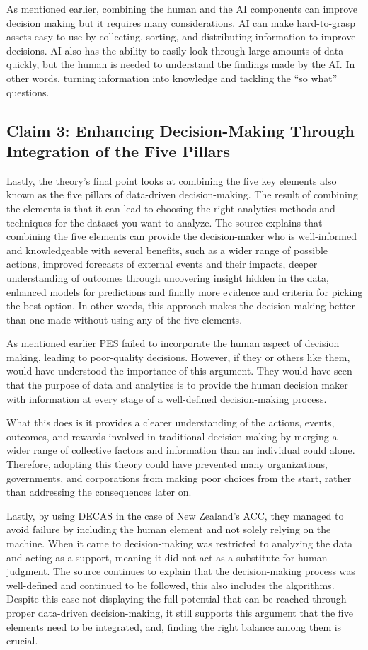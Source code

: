 As mentioned earlier, combining the human and the AI components can improve decision making but it requires many considerations. AI can make hard-to-grasp assets easy to use by collecting, sorting, and distributing information to improve decisions. AI also has the ability to easily look through large amounts of data quickly, but the human is needed to understand the findings made by the AI. In other words, turning information into knowledge and tackling the “so what” questions.


\subsection{Claim 3: Enhancing Decision-Making Through Integration of the Five Pillars}

Lastly, the theory’s final point looks at combining the five key elements also known as the five pillars of data-driven decision-making. The result of combining the elements is that it can lead to choosing the right analytics methods and techniques for the dataset you want to analyze. The source explains that combining the five elements can provide the decision-maker who is well-informed and knowledgeable with several benefits, such as a wider range of possible actions, improved forecasts of external events and their impacts, deeper understanding of outcomes through uncovering insight hidden in the data, enhanced models for predictions and finally more evidence and criteria for picking the best option. In other words, this approach makes the decision making better than one made without using any of the five elements.

As mentioned earlier PES failed to incorporate the human aspect of decision making, leading to poor-quality decisions. However, if they or others like them, would have understood the importance of this argument. They would have seen that the purpose of data and analytics is to provide the human decision maker with information at every stage of a well-defined decision-making process.

What this does is it provides a clearer understanding of the actions, events, outcomes, and rewards involved in traditional decision-making by merging a wider range of collective factors and information than an individual could alone. Therefore, adopting this theory could have prevented many organizations, governments, and corporations from making poor choices from the start, rather than addressing the consequences later on.


Lastly, by using DECAS in the case of New Zealand’s ACC, they managed to avoid failure by including the human element and not solely relying on the machine. When it came to decision-making was restricted to analyzing the data and acting as a support, meaning it did not act as a substitute for human judgment. The source continues to explain that the decision-making process was well-defined and continued to be followed, this also includes the algorithms. Despite this case not displaying the full potential that can be reached through proper data-driven decision-making, it still supports this argument that the five elements need to be integrated, and, finding the right balance among them is crucial.



